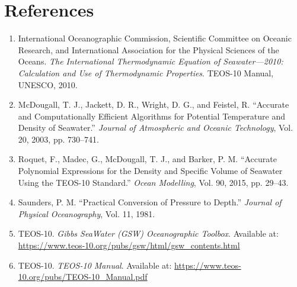 \documentclass[11pt]{article}
\begin{document}
\section{References}

\begin{enumerate}

\item International Oceanographic Commission, Scientific Committee on
Oceanic Research, and International Association for the Physical
Sciences of the Oceans.
\textit{The International Thermodynamic Equation of Seawater---2010:
Calculation and Use of Thermodynamic Properties}.
TEOS-10 Manual, UNESCO, 2010.

\item McDougall, T. J., Jackett, D. R., Wright, D. G., and Feistel, R.
``Accurate and Computationally Efficient Algorithms for Potential
Temperature and Density of Seawater.''
\textit{Journal of Atmospheric and Oceanic Technology},
Vol. 20, 2003, pp. 730--741.

\item Roquet, F., Madec, G., McDougall, T. J., and Barker, P. M.
``Accurate Polynomial Expressions for the Density and Specific Volume
of Seawater Using the TEOS-10 Standard.''
\textit{Ocean Modelling}, Vol. 90, 2015, pp. 29--43.

\item Saunders, P. M.
``Practical Conversion of Pressure to Depth.''
\textit{Journal of Physical Oceanography}, Vol. 11, 1981.

\item TEOS-10.
\textit{Gibbs SeaWater (GSW) Oceanographic Toolbox}.
Available at:
\url{https://www.teos-10.org/pubs/gsw/html/gsw_contents.html}

\item TEOS-10.
\textit{TEOS-10 Manual}.
Available at:
\url{https://www.teos-10.org/pubs/TEOS-10_Manual.pdf}

\end{enumerate}
\end{document}
